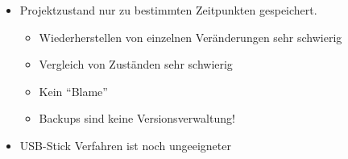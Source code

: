 \begin{frame}
    \slidehead
    \begin{itemize}
        [<+->]
        \item Projektzustand nur zu bestimmten Zeitpunkten gespeichert.
            \begin{itemize}
                \item Wiederherstellen von einzelnen Veränderungen sehr schwierig
                \item Vergleich von Zuständen sehr schwierig
                \item Kein \enquote{Blame}
                \item Backups sind keine Versionsverwaltung!
            \end{itemize}
        \item USB-Stick Verfahren ist noch ungeeigneter
    \end{itemize}
\end{frame}
